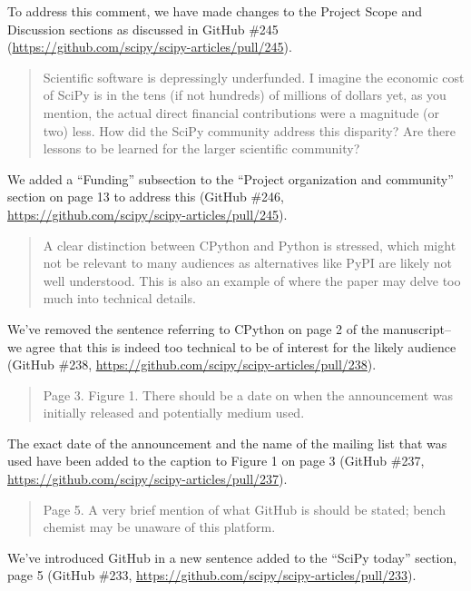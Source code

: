 \documentclass[10pt,stdletter,dateno]{newlfm}
\begin{document}
\begin{newlfm}
To address this comment, we have made changes to the Project Scope and Discussion sections as discussed in GitHub \#245 (\url{https://github.com/scipy/scipy-articles/pull/245}).

\begin{quote}
Scientific software is depressingly underfunded. I imagine the economic cost of SciPy is in the tens (if not hundreds) of millions of dollars yet, as you mention, the actual direct financial contributions were a magnitude (or two) less. How did the SciPy community address this disparity? Are there lessons to be learned for the larger scientific community?
\end{quote}

We added a ``Funding'' subsection to the ``Project organization and community'' section on page 13 to address this (GitHub \#246, \url{https://github.com/scipy/scipy-articles/pull/245}). 

\begin{quote}
A clear distinction between CPython and Python is stressed, which might not be relevant to many audiences as alternatives like PyPI are likely not well understood. This is also an example of where the paper may delve too much into technical details.
\end{quote}

We've removed the sentence referring to CPython on page 2 of the manuscript--we agree that this is indeed too technical to be of interest for the likely audience (GitHub \#238, \url{https://github.com/scipy/scipy-articles/pull/238}). 

\begin{quote}
Page 3. Figure 1. There should be a date on when the announcement was initially released and potentially medium used.
\end{quote}

The exact date of the announcement and the name of the mailing list that was used have been added to the caption to Figure 1 on page 3 (GitHub \#237, \url{https://github.com/scipy/scipy-articles/pull/237}). 

\begin{quote}
Page 5. A very brief mention of what GitHub is should be stated; bench chemist may be unaware of this platform.
\end{quote}

We've introduced GitHub in a new sentence added to the ``SciPy today'' section, page 5 (GitHub \#233, \url{https://github.com/scipy/scipy-articles/pull/233}). 


\end{newlfm}
\end{document}
